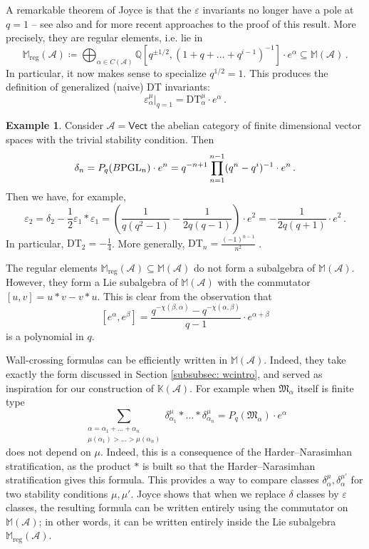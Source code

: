 \documentclass[12pt]{amsart}
\theoremstyle{definition}
\newtheorem{example}[definition]{Example}
\newcommand{\BK}{{\mathbb{K}}}
\newcommand{\BM}{{\mathbb{M}}}
\newcommand{\BQ}{{\mathbb{Q}}}
\newcommand{\CA}{{\mathcal A}}
\newcommand{\1}{\mathbf 1}
\newcommand{\FM}{{\mathfrak{M}}}
\newcommand{\PGL}{{\rm PGL}}
\newcommand{\DT}{\mathrm{DT}}
\newcommand{\reg}{\mathrm{reg}}
\begin{document}
A remarkable theorem of Joyce \cite[Theorem 8.7]{JO06III} is that the $\varepsilon$ invariants no longer have a pole at $q=1$ -- see also \cite{intrinsicDT1} and \cite{BRinertia} for more recent approaches to the proof of this result. More precisely, they are regular elements, i.e. lie in
\[\BM_\reg(\CA)\coloneqq \bigoplus_{\alpha\in C(\CA)}\BQ[q^{\pm 1/2}, (1+q+\ldots+q^{i-1})^{-1}]\cdot e^\alpha\subseteq \BM(\CA)\,.\]
In particular, it now makes sense to specialize $q^{1/2}=1$. This produces the definition of generalized (naive) DT invariants:
\[\varepsilon_\alpha^\mu|_{q=1}=\DT_\alpha^\mu\cdot e^\alpha\,.\]

\begin{example}
    Consider $\CA=\mathsf{Vect}$ the abelian category of finite dimensional vector spaces with the trivial stability condition. Then 
    \[\delta_n=P_q(B\PGL_n)\cdot e^n=q^{-n+1}\prod_{n=1}^{n-1} (q^n-q^i)^{-1}\cdot e^n\,.\]
    Then we have, for example,
    \[\varepsilon_2=\delta_2-\frac{1}{2}\varepsilon_1\ast \varepsilon_1=\left(\frac{1}{q(q^2-1)}-\frac{1}{2q(q-1)}\right)\cdot e^2=-\frac{1}{2q(q+1)}\cdot e^2\,.\]
    In particular, $\DT_2=-\frac{1}{4}$. More generally, $\DT_n=\frac{(-1)^{n-1}}{n^2}$ \cite[Example 6.2]{JS12}.
\end{example}

The regular elements $\BM_\reg(\CA)\subseteq \BM(\CA)$ do not form a subalgebra of $\BM(\CA)$. However, they form a Lie subalgebra of $\BM(\CA)$ with the commutator $[u,v]=u\ast v-v\ast u$. This is clear from the observation that
\[[e^\alpha, e^\beta]=\frac{q^{-\chi(\beta, \alpha)}-q^{-\chi(\alpha, \beta)}}{q-1}\cdot e^{\alpha+\beta}\]
is a polynomial in $q$. 

Wall-crossing formulas can be efficiently written in $\BM(\CA)$. Indeed, they take exactly the form discussed in Section \ref{subsubsec: wcintro}, and served as inspiration for our construction of $\BK(\CA)$. For example when $\FM_\alpha$ itself is finite type
\[\sum_{\substack{\alpha=\alpha_1+\ldots+\alpha_n\\\mu(\alpha_1)>\ldots>\mu(\alpha_n)}}\delta_{\alpha_1}^\mu\ast\ldots\ast \delta_{\alpha_n}^\mu=P_q(\FM_\alpha)\cdot e^\alpha\]
does not depend on $\mu$. Indeed, this is a consequence of the Harder--Narasimhan stratification, as the product $\ast$ is built so that the Harder--Narasimhan stratification gives this formula. This provides a way to compare classes $\delta^{\mu}_\alpha, \delta_\alpha^{\mu'}$ for two stability conditions $\mu, \mu'$. Joyce shows \cite[Theorem 5.4]{JO06IV} that when we replace $\delta$ classes by $\varepsilon$ classes, the resulting formula can be written entirely using the commutator on $\BM(\CA)$; in other words, it can be written entirely inside the Lie subalgebra $\BM_\reg(\CA)$. 
\end{document}
